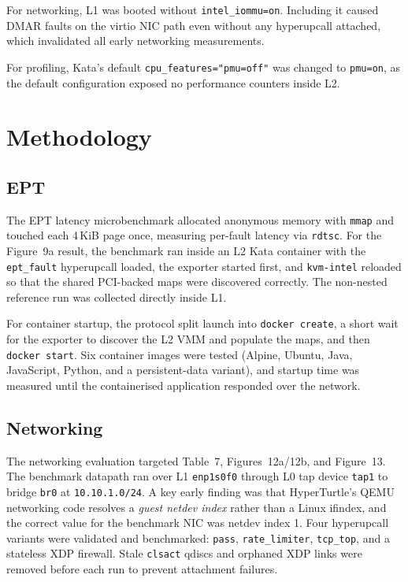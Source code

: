 \documentclass[11pt]{article}
\begin{document}
For networking, L1 was booted without \texttt{intel\_iommu=on}. Including it caused DMAR faults on the virtio NIC path even without any hyperupcall attached, which invalidated all early networking measurements.

For profiling, Kata's default \texttt{cpu\_features="pmu=off"} was changed to \texttt{pmu=on}, as the default configuration exposed no performance counters inside L2.

\section{Methodology}

\subsection{EPT}

The EPT latency microbenchmark allocated anonymous memory with \texttt{mmap} and touched each 4\,KiB page once, measuring per-fault latency via \texttt{rdtsc}. For the Figure~9a result, the benchmark ran inside an L2 Kata container with the \texttt{ept\_fault} hyperupcall loaded, the exporter started first, and \texttt{kvm-intel} reloaded so that the shared PCI-backed maps were discovered correctly. The non-nested reference run was collected directly inside L1.

For container startup, the protocol split launch into \texttt{docker create}, a short wait for the exporter to discover the L2 VMM and populate the maps, and then \texttt{docker start}. Six container images were tested (Alpine, Ubuntu, Java, JavaScript, Python, and a persistent-data variant), and startup time was measured until the containerised application responded over the network.

\subsection{Networking}

The networking evaluation targeted Table~7, Figures~12a/12b, and Figure~13. The benchmark datapath ran over L1 \texttt{enp1s0f0} through L0 tap device \texttt{tap1} to bridge \texttt{br0} at \texttt{10.10.1.0/24}. A key early finding was that HyperTurtle's QEMU networking code resolves a \emph{guest netdev index} rather than a Linux ifindex, and the correct value for the benchmark NIC was netdev index 1. Four hyperupcall variants were validated and benchmarked: \texttt{pass}, \texttt{rate\_limiter}, \texttt{tcp\_top}, and a stateless XDP firewall. Stale \texttt{clsact} qdiscs and orphaned XDP links were removed before each run to prevent attachment failures.
\end{document}
